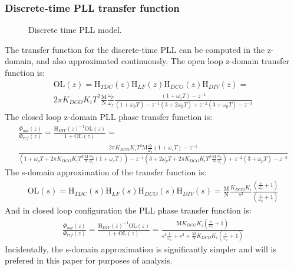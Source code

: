 \subsubsection{Discrete-time PLL transfer function}
\begin{figure}[htb!]
	\center
	\caption{Discrete time PLL model.}
	\label{fig:discrete_pll2}
\end{figure}
\FloatBarrier
The transfer function for the discrete-time PLL can be computed in the z-domain, and also approximated continuously. The open loop z-domain transfer function is:
\begin{align}
\mathrm{OL}(z) = \mathrm{H}_{TDC}(z)\mathrm{H}_{LF}(z)\mathrm{H}_{DCO}(z)\mathrm{H}_{DIV}(z) = \\
2\pi K_{DCO}K_iT^2\frac{\mathrm{M}}{\mathrm{N}}\frac{\omega_p}{\omega_z}\frac{(1+\omega_zT)-z^{-1}}{(1+\omega_pT) - z^{-1}(3+2\omega_pT) + z^{-2}(3+\omega_pT) - z^{-3}}\label{eq:z_lf}
\end{align}
The closed loop z-domain PLL phase transfer function is:
\begin{align}
\frac{\Phi_{out}(z)}{\Phi_{ref}(z)} = \frac{\mathrm{H}_{DIV}(z)^{-1}\mathrm{OL}(z)}{1+\mathrm{OL}(z)} = \\
\frac{2\pi K_{DCO}K_iT^2\mathrm{M}\frac{\omega_p}{\omega_z}(1+\omega_zT)-z^{-1}}{(1+\omega_pT + 2\pi K_{DCO}K_iT^2\frac{\mathrm{M}}{\mathrm{N}}\frac{\omega_p}{\omega_z}(1+\omega_zT))- z^{-1}(3+2\omega_pT+2\pi K_{DCO}K_iT^2\frac{\mathrm{M}}{\mathrm{N}}\frac{\omega_p}{\omega_z})+ z^{-2}(3+\omega_pT) - z^{-3}}
\end{align}
The s-domain approximation of the transfer function is:
\begin{align}
\mathrm{OL}(s) = \mathrm{H}_{TDC}(s)\mathrm{H}_{LF}(s)\mathrm{H}_{DCO}(s)\mathrm{H}_{DIV}(s) = \frac{\mathrm{M}}{\mathrm{N}}\frac{K_{DCO}K_i}{s^2} \frac{\left(\frac{s}{\omega_z} + 1\right)}{\left(\frac{s}{\omega_p} + 1\right)}
\end{align}
And in closed loop configuration the PLL phase transfer function is:
\begin{align}
\frac{\Phi_{out}(z)}{\Phi_{ref}(z)} = \frac{\mathrm{H}_{DIV}(z)^{-1}\mathrm{OL}(z)}{1+\mathrm{OL}(z)} = \frac{\mathrm{M}K_{DCO}K_i\left(\frac{s}{\omega_z} + 1\right)}{s^3\frac{1}{\omega_z} + s^2 + \frac{\mathrm{M}}{\mathrm{N}}K_{DCO}K_i\left(\frac{s}{\omega_z} + 1\right)}
\end{align}
Incidentally, the s-domain approximation is significantly simpler and will is prefered in this paper for purposes of analysis.


